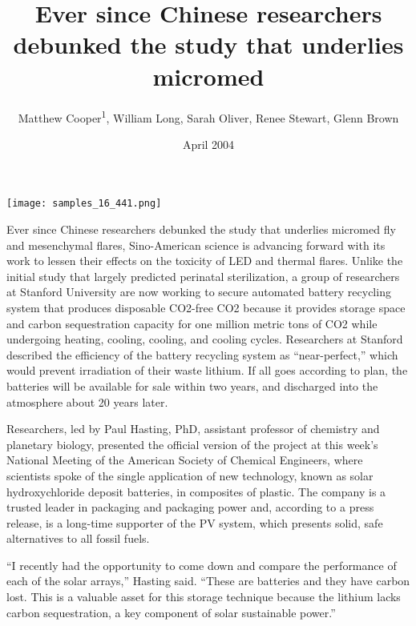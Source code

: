 \documentclass{article}
\title{Ever since Chinese researchers debunked the study that underlies micromed}
\author{Matthew Cooper\textsuperscript{1},  William Long,  Sarah Oliver,  Renee Stewart,  Glenn Brown}
\affil{\textsuperscript{1}Universiti Teknologi MARA}
\date{April 2004}
\begin{document}
\maketitle

\begin{center}
\begin{minipage}{0.75\linewidth}
\texttt{[image: samples\_16\_441.png]}
\end{minipage}
\end{center}

Ever since Chinese researchers debunked the study that underlies micromed fly and mesenchymal flares, Sino-American science is advancing forward with its work to lessen their effects on the toxicity of LED and thermal flares. Unlike the initial study that largely predicted perinatal sterilization, a group of researchers at Stanford University are now working to secure automated battery recycling system that produces disposable CO2-free CO2 because it provides storage space and carbon sequestration capacity for one million metric tons of CO2 while undergoing heating, cooling, cooling, and cooling cycles. Researchers at Stanford described the efficiency of the battery recycling system as “near-perfect,” which would prevent irradiation of their waste lithium. If all goes according to plan, the batteries will be available for sale within two years, and discharged into the atmosphere about 20 years later.

Researchers, led by Paul Hasting, PhD, assistant professor of chemistry and planetary biology, presented the official version of the project at this week’s National Meeting of the American Society of Chemical Engineers, where scientists spoke of the single application of new technology, known as solar hydroxychloride deposit batteries, in composites of plastic. The company is a trusted leader in packaging and packaging power and, according to a press release, is a long-time supporter of the PV system, which presents solid, safe alternatives to all fossil fuels.

“I recently had the opportunity to come down and compare the performance of each of the solar arrays,” Hasting said. “These are batteries and they have carbon lost. This is a valuable asset for this storage technique because the lithium lacks carbon sequestration, a key component of solar sustainable power.”
\end{document}
